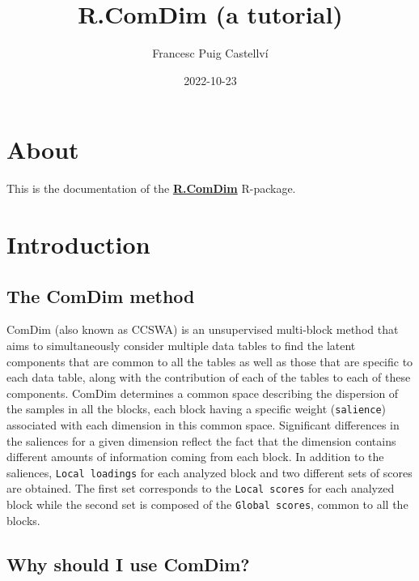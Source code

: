 \documentclass[
]{book}
\title{R.ComDim (a tutorial)}
\author{Francesc Puig Castellví}
\date{2022-10-23}
\begin{document}
\maketitle

{
\setcounter{tocdepth}{1}
\tableofcontents
}
\hypertarget{about}{%
\chapter{About}\label{about}}

This is the documentation of the
\href{https://github.com/f-puig/R.ComDim}{\textbf{R.ComDim}} R-package.

\hypertarget{introduction}{%
\chapter{Introduction}\label{introduction}}

\hypertarget{ComDim}{%
\section{The ComDim method}\label{ComDim}}

ComDim (also known as CCSWA) is an unsupervised multi-block method that aims to
simultaneously consider multiple data tables to find the latent components that
are common to all the tables as well as those that are specific to each data
table, along with the contribution of each of the tables to each of these
components. ComDim determines a common space describing the dispersion of the
samples in all the blocks, each block having a specific weight (\texttt{salience})
associated with each dimension in this common space. Significant differences
in the saliences for a given dimension reflect the fact that the dimension
contains different amounts of information coming from each block. In addition
to the saliences, \texttt{Local\ loadings} for each analyzed block and two different
sets of scores are obtained. The first set corresponds to the \texttt{Local\ scores} for
each analyzed block while the second set is composed of the \texttt{Global\ scores},
common to all the blocks.

\hypertarget{why}{%
\section{Why should I use ComDim?}\label{why}}
\end{document}
